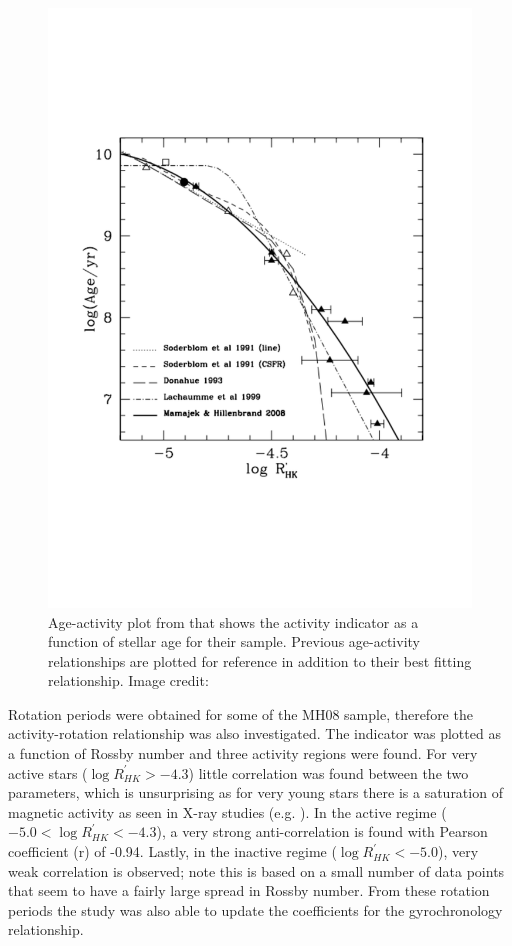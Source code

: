 \begin{figure}
    \centering
    \includegraphics[scale=0.45]{Figures/2-Historical_overview/MH08_age_activity.pdf}
    \caption[Age-activity plot from \citet{Mamajek_Hillenbrand_2008} using chromospheric emission]{Age-activity plot from \citet{Mamajek_Hillenbrand_2008} that shows the \Rprime activity indicator as a function of stellar age for their sample. Previous age-activity relationships are plotted for reference in addition to their best fitting relationship. Image credit: \citet{Mamajek_Hillenbrand_2008}}
    \label{fig:MH08_age_activity_plot}
\end{figure}

Rotation periods were obtained for some of the MH08 sample, therefore the activity-rotation relationship was also investigated. The \Rprime indicator was plotted as a function of Rossby number  and three activity regions were found. For very active stars ($\log R^{'}_{HK} > -4.3$) little correlation was found between the two parameters, which is unsurprising as for very young stars there is a saturation of magnetic activity as seen in X-ray studies (e.g. \citealt{Jackson_etal_2012}). In the active regime ($-5.0 < \log R^{'}_{HK} < -4.3$), a very strong anti-correlation is found with Pearson coefficient (r) of -0.94. Lastly, in the inactive regime ($\log R^{'}_{HK} < -5.0$), very weak correlation is observed; note this is based on a small number of data points that seem to have a fairly large spread in Rossby number. From these rotation periods the study was also able to update the coefficients for the \citet{Barnes_2007} gyrochronology relationship.

